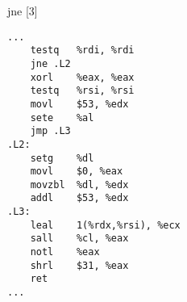 \begin{figure}[H]
\begin{subfigure}[T]{0.30333333333333334\textwidth}
\begin{lrbox}{\mybox}
%
        \end{lrbox}\resizebox{\textwidth}{!}{\usebox{\mybox}}
\end{subfigure}
\begin{subfigure}[T]{0.30333333333333334\textwidth}
\caption*{}
\end{subfigure}
\begin{subfigure}[T]{0.30333333333333334\textwidth}
\caption*{}
\end{subfigure}
\hspace*{6mm}
\begin{subfigure}[T]{0.2733333333333333\textwidth}
\vspace*{2mm}\tiny jne [3]
\begin{lstlisting}[style=defstyle,language={[x86masm]Assembler},basicstyle=\tiny\ttfamily,breaklines=true]
...
	testq	%rdi, %rdi
	jne	.L2
	xorl	%eax, %eax
	testq	%rsi, %rsi
	movl	$53, %edx
	sete	%al
	jmp	.L3
.L2:
	setg	%dl
	movl	$0, %eax
	movzbl	%dl, %edx
	addl	$53, %edx
.L3:
	leal	1(%rdx,%rsi), %ecx
	sall	%cl, %eax
	notl	%eax
	shrl	$31, %eax
	ret
...\end{lstlisting}
\end{subfigure}
\end{figure}
\newpage\noindent